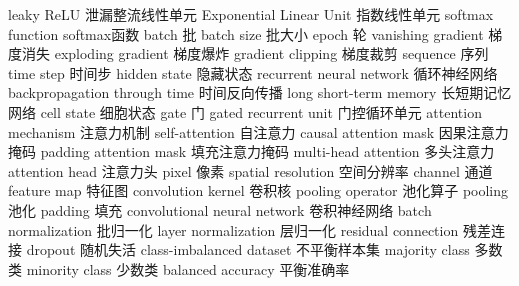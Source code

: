 {leaky ReLU} 
{泄漏整流线性单元}
{Exponential Linear Unit} 
{指数线性单元}
{softmax function} 
{softmax函数}
{batch} 
{批}
{batch size} 
{批大小}
{epoch} 
{轮}
{vanishing gradient}
{梯度消失}
{exploding gradient}
{梯度爆炸}
{gradient clipping}
{梯度裁剪}
{sequence}
{序列}
{time step}
{时间步}
{hidden state}
{隐藏状态}
{recurrent neural network}
{循环神经网络}
{backpropagation through time}
{时间反向传播}
{long short-term memory}
{长短期记忆网络}
{cell state}
{细胞状态}
{gate}
{门}
{gated recurrent unit}
{门控循环单元}
{attention mechanism}
{注意力机制}
{self-attention}
{自注意力}
{causal attention mask}
{因果注意力掩码}
{padding attention mask}
{填充注意力掩码}
{multi-head attention}
{多头注意力}
{attention head}
{注意力头}
{pixel} 
{像素}
{spatial resolution} 
{空间分辨率}
{channel} 
{通道}
{feature map} 
{特征图}
{convolution kernel} 
{卷积核}
{pooling operator} 
{池化算子}
{pooling} 
{池化}
{padding} 
{填充}
{convolutional neural network} 
{卷积神经网络}
{batch normalization}
{批归一化}
{layer normalization}
{层归一化}
{residual connection}
{残差连接}
{dropout}
{随机失活}
{class-imbalanced dataset}
{不平衡样本集}
{majority class}
{多数类}
{minority class}
{少数类}
{balanced accuracy}
{平衡准确率}
